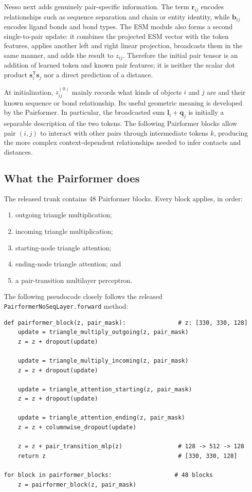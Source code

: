 \documentclass[11pt]{article}
\begin{document}
Nesso next adds genuinely pair-specific information. The term
$\mathbf r_{ij}$ encodes relationships such as sequence separation and chain
or entity identity, while $\mathbf b_{ij}$ encodes ligand bonds and bond types.
The ESM module also forms a second single-to-pair update: it combines the
projected ESM vector with the token features, applies another left and right
linear projection, broadcasts them in the same manner, and adds the result to
$z_{ij}$. Therefore the initial pair tensor is an addition of learned token and
known pair features; it is neither the scalar dot product
$\mathbf s_i^{\mathsf T}\mathbf s_j$ nor a direct prediction of a distance.

At initialization, $z_{ij}^{(0)}$ mainly records what kinds of objects $i$ and
$j$ are and their known sequence or bond relationship. Its useful geometric
meaning is developed by the Pairformer. In particular, the broadcasted sum
$\mathbf l_i+\mathbf q_j$ is initially a separable description of the two
tokens. The following Pairformer blocks allow pair $(i,j)$ to interact with
other pairs through intermediate tokens $k$, producing the more complex
context-dependent relationships needed to infer contacts and distances.

\subsection{What the Pairformer does}

The released trunk contains 48 Pairformer blocks. Every block applies, in
order:

\begin{enumerate}
  \item outgoing triangle multiplication;
  \item incoming triangle multiplication;
  \item starting-node triangle attention;
  \item ending-node triangle attention; and
  \item a pair-transition multilayer perceptron.
\end{enumerate}

The following pseudocode closely follows the released
\texttt{PairformerNoSeqLayer.forward} method:
\begin{verbatim}
def pairformer_block(z, pair_mask):               # z: [330, 330, 128]
    update = triangle_multiply_outgoing(z, pair_mask)
    z = z + dropout(update)

    update = triangle_multiply_incoming(z, pair_mask)
    z = z + dropout(update)

    update = triangle_attention_starting(z, pair_mask)
    z = z + dropout(update)

    update = triangle_attention_ending(z, pair_mask)
    z = z + columnwise_dropout(update)

    z = z + pair_transition_mlp(z)                # 128 -> 512 -> 128
    return z                                      # [330, 330, 128]

for block in pairformer_blocks:                  # 48 blocks
    z = pairformer_block(z, pair_mask)
\end{verbatim}
\end{document}
